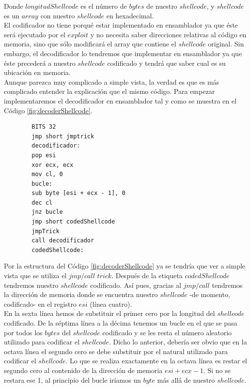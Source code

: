 \documentclass [titlepage, 12pt]{article}
\begin{document}
Donde $longitudShellcode$ es el n\'umero de $bytes$ de nuestro $shellcode$, y $shellcode$ es un $array$ con nuestro $shellcode$ en hexadecimal.\\
El codificador no tiene porqu\'e estar implementado en ensamblador ya que \'este ser\'a ejecutado por el $exploit$ y no necesita saber direcciones relativas al c\'odigo en memoria, sino que s\'olo modificar\'a el array que contiene el $shellcode$ original. Sin embargo, el decodificador lo tendremos que implementar en ensamblador ya que \'este preceder\'a a nuestro $shellcode$ codificado y tendr\'a que saber cual es su ubicaci\'on en memoria.\\
Aunque parezca muy complicado a simple vista, la verdad es que es m\'as complicado entender la explicaci\'on que el mismo c\'odigo. Para empezar implementaremos el decodificador en ensamblador tal y como se muestra en el C\'odigo \ref{fig:decoderShellcode}.

\lstset{language=[x86masm]Assembler,caption=Decodificador en ensamblador,label=fig:decoderShellcode}
\begin{lstlisting}				
		BITS 32
		jmp short jmptrick
		decodificador:
		pop esi
		xor ecx, ecx
		mov cl, 0
		bucle:
		sub byte [esi + ecx - 1], 0
		dec cl
		jnz bucle
		jmp short codedShellcode
		jmpTrick
		call decodificador
		codedShellcode:
\end{lstlisting}

Por la estructura del C\'odigo \ref{fig:decoderShellcode} ya se tendr\'ia que ver a simple vista que se utiliza el $jmp/call$ $trick$. Despu\'es de la etiqueta $codedShellcode$ tendremos nuestro $shellcode$ codificado. As\'i pues, gracias al $jmp/call$ tendremos la direcci\'on de memoria donde se encuentra nuestro $shellcode$ -de momento, codificado- en el registro $esi$ (l\'inea cuatro).\\
En la sexta l\'inea hemos de substituir el primer cero por la longitud del $shellcode$ codificado. De la s\'eptima l\'inea a la d\'ecima tenemos un bucle en el que se pasa por todos los $bytes$ del $shellcode$ codificado y se les resta el n\'umero aleatorio utilizado para codificar el $shellcode$. Dicho lo anterior, deber\'ia ser obvio que en la octava l\'inea el segundo cero se debe substituir por el natural utilizado para codificar el $shellcode$. Lo que se realiza exactamente en la octava l\'inea es restar el segundo cero al contenido de la direcci\'on de memoria $esi+ecx-1$. Si no se restara ese 1, al principio del bucle ir\'iamos un $byte$ m\'as all\'a de nuestro $shellcode$. \bigskip
\end{document}
